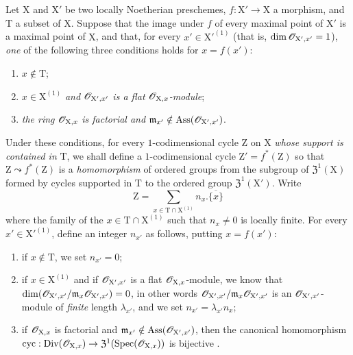 \begin{env}[21.10.1]
\label{IV.21.10.1}
\enlargethispage{2pt}
Let $\mathrm{X}$ and $\mathrm{X}'$ be two locally Noetherian preschemes, $f:\mathrm{X}'\to\mathrm{X}$ a morphism, and $\mathrm{T}$ a subset of $\mathrm{X}$.
Suppose that the image under $f$ of every maximal point of $\mathrm{X}'$ is a maximal point of $\mathrm{X}$, and that, for every $x'\in\mathrm{X}'^{(1)}$ (that is, $\dim\mathscr{O}_{\mathrm{X}',x'}=1$), \emph{one} of the following three conditions holds for $x=f(x')$:
\begin{enumerate}[label=(\roman*)]
  \item $x\notin\mathrm{T}$;
  \item $x\in\mathrm{X}^{(1)}$ \emph{and} $\mathscr{O}_{\mathrm{X}',x'}$ \emph{is a flat} $\mathscr{O}_{\mathrm{X},x}$\emph{-module};
  \item \emph{the ring} $\mathscr{O}_{\mathrm{X},x}$ \emph{is factorial and} $\mathfrak{m}_{x'}\notin\operatorname{Ass}(\mathscr{O}_{\mathrm{X}',x'})$.
\end{enumerate}
Under these conditions, for every $1$-codimensional cycle $\mathrm{Z}$ on $\mathrm{X}$ \emph{whose support is contained in} $\mathrm{T}$, we shall define a $1$-codimensional cycle $\mathrm{Z}'=f^*(\mathrm{Z})$ so that $\mathrm{Z}\leadsto f^*(\mathrm{Z})$ is a \emph{homomorphism} of ordered groups from the subgroup of $\mathfrak{Z}^1(\mathrm{X})$ formed by cycles supported in $\mathrm{T}$ to the ordered group $\mathfrak{Z}^1(\mathrm{X}')$.
Write
\[
\label{IV.21.10.1.1}
  \mathrm{Z} = \sum_{x\in\mathrm{T}\cap\mathrm{X}^{(1)}} n_x.\overline{\{x\}}
  \tag{21.10.1.1}
\]
where the family of the $x\in\mathrm{T}\cap\mathrm{X}^{(1)}$ such that $n_x\neq 0$ is locally finite.
For every $x'\in\mathrm{X}'^{(1)}$, define an integer $n_{x'}$ as follows, putting $x=f(x')$:
\begin{enumerate}[label=\arabic*\textsuperscript{o}]
  \item if $x\notin\mathrm{T}$, we set $n_{x'}=0$;
  \item if $x\in\mathrm{X}^{(1)}$ and if $\mathscr{O}_{\mathrm{X}',x'}$ is a flat $\mathscr{O}_{\mathrm{X},x}$-module, we know  that $\dim(\mathscr{O}_{\mathrm{X}',x'}/\mathfrak{m}_x\mathscr{O}_{\mathrm{X}',x'})=0$, in other words $\mathscr{O}_{\mathrm{X}',x'}/\mathfrak{m}_x\mathscr{O}_{\mathrm{X}',x'}$ is an $\mathscr{O}_{\mathrm{X}',x'}$-module of \emph{finite} length $\lambda_{x'}$, and we set $n_{x'}=\lambda_{x'}n_x$;
  \item if $\mathscr{O}_{\mathrm{X},x}$ is factorial and $\mathfrak{m}_{x'}\notin\operatorname{Ass}(\mathscr{O}_{\mathrm{X}',x'})$, then the canonical homomorphism $\operatorname{cyc}:\operatorname{Div}(\mathscr{O}_{\mathrm{X},x})\to\mathfrak{Z}^1(\operatorname{Spec}(\mathscr{O}_{\mathrm{X},x}))$ is bijective .

\end{enumerate}
\end{env}

